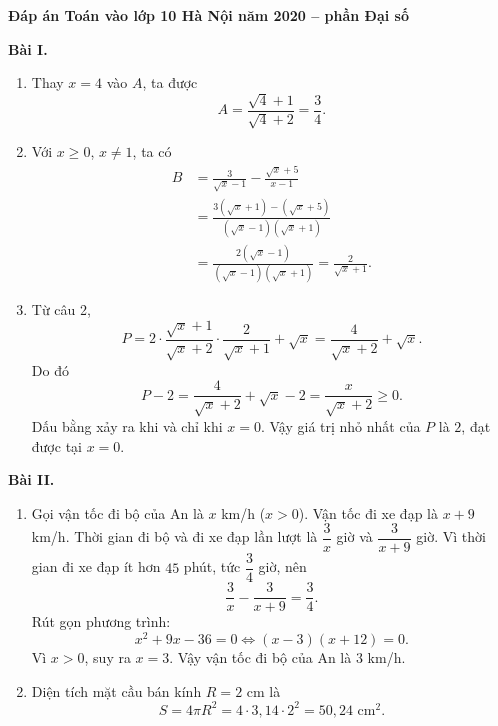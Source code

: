 \documentclass[12pt,a4paper]{article}
\begin{document}
\begin{center}
{\Large\bfseries Đáp án Toán vào lớp 10 Hà Nội năm 2020 -- phần Đại số}
\end{center}

\textbf{Bài I.}
\begin{enumerate}[label=\arabic*)]
  \item Thay $x=4$ vào $A$, ta được
  \[
  A=\frac{\sqrt{4}+1}{\sqrt{4}+2}=\frac{3}{4}.
  \]
  \item Với $x\ge 0$, $x\ne1$, ta có
  \begin{align*}
  B&=\frac{3}{\sqrt{x}-1}-\frac{\sqrt{x}+5}{x-1}\\
   &=\frac{3(\sqrt{x}+1)-(\sqrt{x}+5)}{(\sqrt{x}-1)(\sqrt{x}+1)}\\
   &=\frac{2(\sqrt{x}-1)}{(\sqrt{x}-1)(\sqrt{x}+1)}
    =\frac{2}{\sqrt{x}+1}.
  \end{align*}
  \item Từ câu 2,
  \[
  P=2\cdot\frac{\sqrt{x}+1}{\sqrt{x}+2}\cdot\frac{2}{\sqrt{x}+1}+\sqrt{x}
   =\frac{4}{\sqrt{x}+2}+\sqrt{x}.
  \]
  Do đó
  \[
  P-2=\frac{4}{\sqrt{x}+2}+\sqrt{x}-2
      =\frac{x}{\sqrt{x}+2}\ge 0.
  \]
  Dấu bằng xảy ra khi và chỉ khi $x=0$. Vậy giá trị nhỏ nhất của $P$ là $2$, đạt được tại $x=0$.
\end{enumerate}

\textbf{Bài II.}
\begin{enumerate}[label=\arabic*)]
  \item Gọi vận tốc đi bộ của An là $x$ km/h ($x>0$). Vận tốc đi xe đạp là $x+9$ km/h. Thời gian đi bộ và đi xe đạp lần lượt là $\dfrac{3}{x}$ giờ và $\dfrac{3}{x+9}$ giờ. Vì thời gian đi xe đạp ít hơn $45$ phút, tức $\dfrac{3}{4}$ giờ, nên
  \[
  \frac{3}{x}-\frac{3}{x+9}=\frac{3}{4}.
  \]
  Rút gọn phương trình:
  \[
  x^2+9x-36=0\Longleftrightarrow (x-3)(x+12)=0.
  \]
  Vì $x>0$, suy ra $x=3$. Vậy vận tốc đi bộ của An là $3$ km/h.
  \item Diện tích mặt cầu bán kính $R=2$ cm là
  \[
  S=4\pi R^2=4\cdot3{,}14\cdot2^2=50{,}24\text{ cm}^2.
  \]
\end{enumerate}
\end{document}
